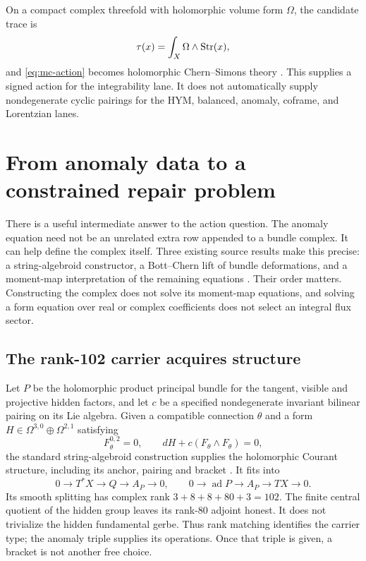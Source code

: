 \documentclass[11pt,a4paper]{article}
\newcommand{\ad}{\operatorname{ad}}
\begin{document}
On a compact complex threefold with holomorphic volume form \(\Omega\), the
candidate trace is
\[
\tau(x)=\int_X\Omega\wedge\operatorname{Str}(x),
\]
and \eqref{eq:mc-action} becomes holomorphic Chern--Simons theory
\cite{Witten1992,Costello2004}.  This supplies a signed action for the
integrability lane.  It does not automatically supply nondegenerate cyclic
pairings for the HYM, balanced, anomaly, coframe, and Lorentzian lanes.

\section{From anomaly data to a constrained repair problem}
\label{sec:string-repair}

There is a useful intermediate answer to the action question. The anomaly
equation need not be an unrelated extra row appended to a bundle complex.
It can help define the complex itself. Three existing source results make
this precise: a string-algebroid constructor, a Bott--Chern lift of bundle
deformations, and a moment-map interpretation of the remaining equations
\cite{PreprojectionStringConstructor2026,PreprojectionBCLift2026,
PreprojectionCalabiRoles2026}. Their order matters. Constructing the complex
does not solve its moment-map equations, and solving a form equation over
real or complex coefficients does not select an integral flux sector.

\subsection{The rank-102 carrier acquires structure}
\label{sec:string-constructor}

Let \(P\) be the holomorphic product principal bundle for the tangent,
visible and projective hidden factors, and let \(c\) be a specified
nondegenerate invariant bilinear pairing on its Lie algebra. Given a
compatible connection \(\theta\) and a form
\(H\in\Omega^{3,0}\oplus\Omega^{2,1}\) satisfying
\[
 F_\theta^{0,2}=0,\qquad dH+c(F_\theta\wedge F_\theta)=0,
 \tag{S1}\label{eq:string-anomaly}
\]
the standard string-algebroid construction supplies the holomorphic
Courant structure, including its anchor, pairing and bracket
\cite[Proposition 2.4]{GarciaRubioTiplerString2018}. It fits into
\[
 0\longrightarrow T^*X\longrightarrow Q\longrightarrow A_P
 \longrightarrow0,\qquad
 0\longrightarrow\ad P\longrightarrow A_P\longrightarrow TX
 \longrightarrow0.
\]
Its smooth splitting has complex rank \(3+8+8+80+3=102\).
The finite central quotient of the hidden group leaves its rank-80 adjoint
honest. It does not trivialize the hidden fundamental gerbe. Thus rank
matching identifies the carrier type; the anomaly triple supplies its
operations. Once that triple is given, a bracket is not another free choice.
\end{document}
